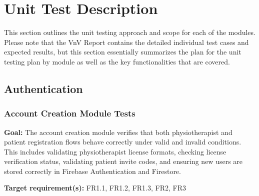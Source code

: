 \documentclass[12pt, titlepage]{article}
\begin{document}
\section{Unit Test Description}

This section outlines the unit testing approach and scope for each of the modules. Please note that the VnV Report contains 
the detailed individual test cases and expected results, but this section essentially summarizes the plan for the unit testing plan 
by module as well as the key functionalities that are covered.
\subsection{Authentication}

\subsubsection{Account Creation Module Tests}

\textbf{Goal:} The account creation module verifies that both physiotherapist and patient registration flows behave correctly under valid and invalid conditions. This includes validating physiotherapist license formats, checking license verification status, validating patient invite codes, and ensuring new users are stored correctly in Firebase Authentication and Firestore.

\textbf{Target requirement(s):} FR1.1, FR1.2, FR1.3, FR2, FR3
\end{document}
